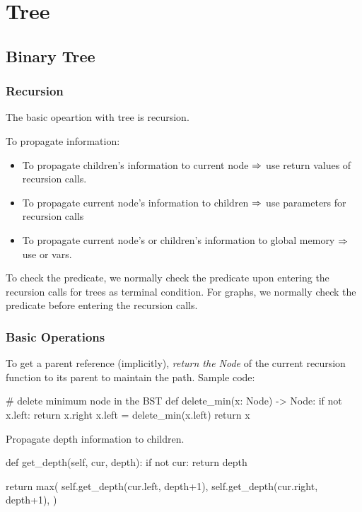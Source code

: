\chapter{Tree}

\section{Binary Tree}
\subsection{Recursion}
The basic opeartion with tree is recursion. 

 To propagate information:
\begin{itemize}
\item To propagate children's information to current node $\Rightarrow$ use return values of recursion calls.
\item To propagate current node's information to children $\Rightarrow$ use parameters for recursion calls
\item To propagate current node's or children's information to global memory $\Rightarrow$ use  or  vars. 
\end{itemize}

 To check the predicate, we normally check the predicate upon entering the recursion calls for trees as terminal condition. For graphs, we normally check the predicate before entering the recursion calls. 

\subsection{Basic Operations}
 To get a parent reference (implicitly), \textit{return the Node} of the current recursion function to its parent to maintain the path. Sample code:
\begin{python}
# delete minimum node in the BST
def delete_min(x: Node) -> Node:
    if not x.left:
        return x.right
    x.left = delete_min(x.left)
    return x
\end{python}

 Propagate depth information to children. 
\begin{python}
def get_depth(self, cur, depth):
    if not cur:
        return depth

    return max(
        self.get_depth(cur.left, depth+1), 
        self.get_depth(cur.right, depth+1),
    )
\end{python}

